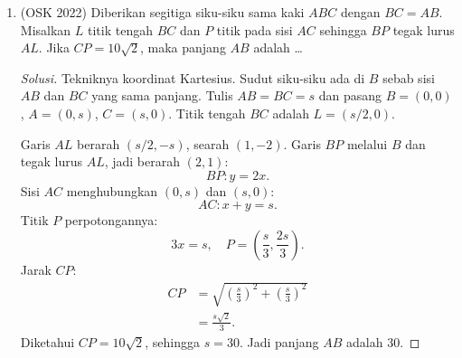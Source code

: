 \documentclass[12pt]{scrartcl}
\begin{document}
\begin{enumerate}[resume]
	\item (OSK 2022)
	Diberikan segitiga siku-siku sama kaki $ABC$ dengan $BC=AB$.
	Misalkan $L$ titik tengah $BC$ dan $P$ titik pada sisi $AC$ sehingga
	$BP$ tegak lurus $AL$. Jika $CP=10\sqrt{2}$, maka panjang $AB$
	adalah \dots
\begin{center}
\end{center}
	\begin{proof}[Solusi]
	Tekniknya koordinat Kartesius. Sudut siku-siku ada di $B$ sebab
	sisi $AB$ dan $BC$ yang sama panjang. Tulis $AB = BC = s$ dan
	pasang $B = (0,0)$, $A = (0,s)$, $C = (s,0)$. Titik tengah $BC$
	adalah $L = (s/2, 0)$.

	Garis $AL$ berarah $(s/2, -s)$, searah $(1, -2)$. Garis $BP$
	melalui $B$ dan tegak lurus $AL$, jadi berarah $(2, 1)$:
	\[ BP : y = 2x. \]
	Sisi $AC$ menghubungkan $(0,s)$ dan $(s,0)$:
	\[ AC : x + y = s. \]
	Titik $P$ perpotongannya:
	\[ 3x = s, \quad P = \left(\frac{s}{3}, \frac{2s}{3}\right). \]
	Jarak $CP$:
	\begin{align*}
	CP &= \sqrt{\left(\frac{s}{3}\right)^2 + \left(\frac{s}{3}\right)^2} \\
	&= \frac{s\sqrt{2}}{3}.
	\end{align*}
	Diketahui $CP = 10\sqrt{2}$, sehingga $s = 30$. Jadi panjang $AB$
	adalah $30$.
	\end{proof}


\end{enumerate}
\end{document}
